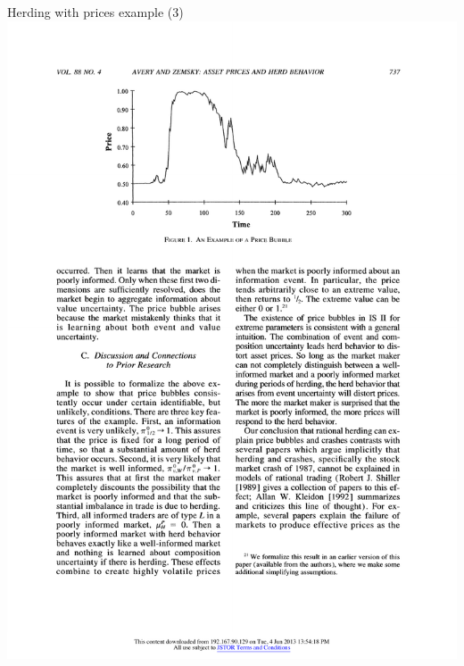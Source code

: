 \documentclass[english,10pt
,aspectratio=169
]{beamer}
\begin{document}
\begin{frame}{Herding with prices example (3)}
	\includegraphics[width=0.17\paperwidth]{pics/Price2} \hfill

\end{frame}
\end{document}
